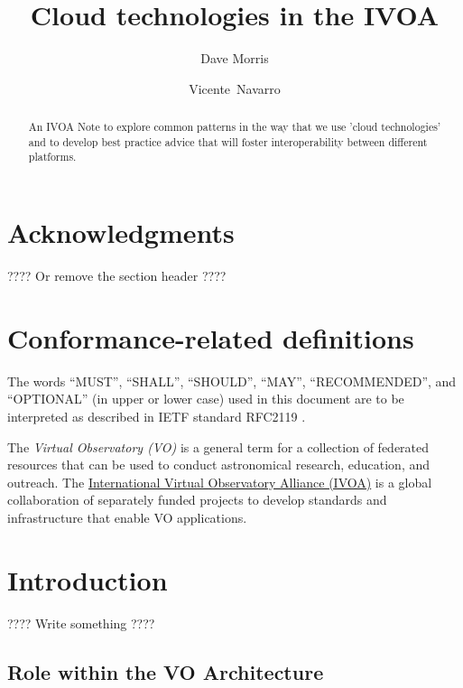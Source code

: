 \documentclass[11pt,a4paper]{ivoa}
\title{Cloud technologies in the IVOA}
\author[http://www.ivoa.net/twiki/bin/view/IVOA/DaveMorris]
       {Dave Morris}
\author{Vicente Navarro}
\begin{document}
\begin{abstract}
An IVOA Note to explore common patterns in the way that we use 'cloud technologies'
and to develop best practice advice that will foster interoperability between
different platforms.
\end{abstract}

\section*{Acknowledgments}

???? Or remove the section header ????

\section*{Conformance-related definitions}

The words ``MUST'', ``SHALL'', ``SHOULD'', ``MAY'', ``RECOMMENDED'', and
``OPTIONAL'' (in upper or lower case) used in this document are to be
interpreted as described in IETF standard RFC2119 \citep{std:RFC2119}.

The \emph{Virtual Observatory (VO)} is a
general term for a collection of federated resources that can be used
to conduct astronomical research, education, and outreach.
The \href{https://www.ivoa.net}{International
Virtual Observatory Alliance (IVOA)} is a global
collaboration of separately funded projects to develop standards and
infrastructure that enable VO applications.


\section{Introduction}

???? Write something ????

\subsection{Role within the VO Architecture}



\end{document}
